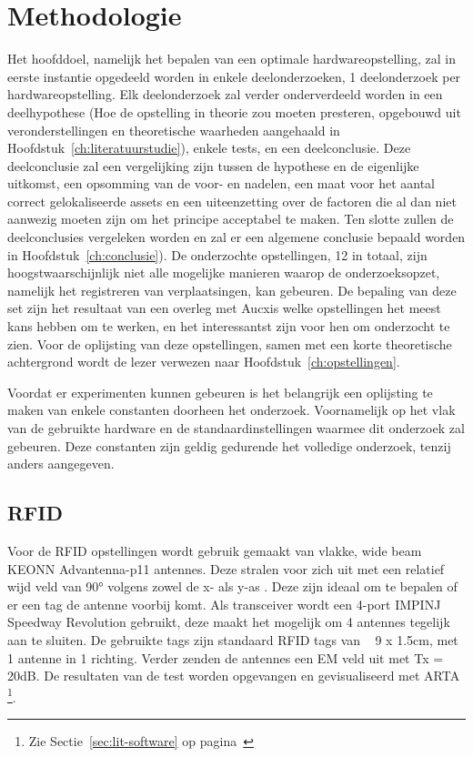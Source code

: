 
\chapter{Methodologie}
\label{ch:methodologie}

Het hoofddoel, namelijk het bepalen van een optimale hardwareopstelling, zal in eerste instantie opgedeeld worden in enkele deelonderzoeken, 1 deelonderzoek per hardwareopstelling. Elk deelonderzoek zal verder onderverdeeld worden in een deelhypothese (Hoe de opstelling in theorie zou moeten presteren, opgebouwd uit veronderstellingen en theoretische waarheden aangehaald in Hoofdstuk~\ref{ch:literatuurstudie}), enkele tests, en een deelconclusie. Deze deelconclusie zal een vergelijking zijn tussen de hypothese en de eigenlijke uitkomst, een opsomming van de voor- en nadelen, een maat voor het aantal correct gelokaliseerde assets en een uiteenzetting over de factoren die al dan niet aanwezig moeten zijn om het principe acceptabel te maken. Ten slotte zullen de deelconclusies vergeleken worden en zal er een algemene conclusie bepaald worden in Hoofdstuk~\ref{ch:conclusie}). De onderzochte opstellingen, 12 in totaal, zijn hoogstwaarschijnlijk niet alle mogelijke manieren waarop de onderzoeksopzet, namelijk het registreren van verplaatsingen, kan gebeuren. De bepaling van deze set zijn het resultaat van een overleg met Aucxis welke opstellingen het meest kans hebben om te werken, en het interessantst zijn voor hen om onderzocht te zien. Voor de oplijsting van deze opstellingen, samen met een korte theoretische achtergrond wordt de lezer verwezen naar Hoofdstuk~\ref{ch:opstellingen}.

Voordat er experimenten kunnen gebeuren is het belangrijk een oplijsting te maken van enkele constanten doorheen het onderzoek. Voornamelijk op het vlak van de gebruikte hardware en de standaardinstellingen waarmee dit onderzoek zal gebeuren. Deze constanten zijn geldig gedurende het volledige onderzoek, tenzij anders aangegeven.

\section{RFID}
\label{sec:met-rfid}
Voor de RFID opstellingen wordt gebruik gemaakt van vlakke, wide beam KEONN Advantenna-p11 antennes. Deze stralen voor zich uit met een relatief wijd veld van 90° volgens zowel de x- als y-as \autocite{Keonn}. Deze zijn ideaal om te bepalen of er een tag de antenne voorbij komt.
Als transceiver wordt een 4-port IMPINJ Speedway Revolution gebruikt, deze maakt het mogelijk om 4 antennes tegelijk aan te sluiten. De gebruikte tags zijn standaard RFID tags van ~ 9 x 1.5cm, met 1 antenne in 1 richting. Verder zenden de antennes een EM veld uit met Tx = 20dB. De resultaten van de test worden opgevangen en gevisualiseerd met ARTA \footnote{Zie Sectie~\ref{sec:lit-software} op pagina~\pageref{sec:lit-software}}.

